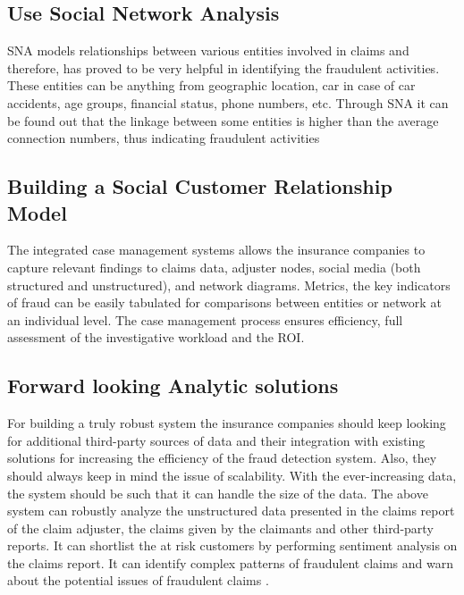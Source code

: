 \documentclass[sigconf]{acmart}
\begin{document}
\subsection{Use Social Network Analysis}
SNA models relationships between various entities involved in claims and therefore, has proved to be very helpful in identifying the fraudulent activities. These entities can be anything from geographic location, car in case of car accidents, age groups, financial status, phone numbers, etc. Through SNA it can be found out that the linkage between some entities is higher than the average connection numbers, thus indicating fraudulent activities
\subsection{Building a Social Customer Relationship Model}
The integrated case management systems allows the insurance companies to capture relevant findings to claims data, adjuster nodes, social media (both structured and unstructured), and network diagrams. Metrics, the key indicators of fraud can be easily tabulated for comparisons between entities or network at an individual level. The case management process ensures efficiency, full assessment of the investigative workload and the ROI.
\subsection{Forward looking Analytic solutions}
For building a truly robust system the insurance companies should keep looking for additional third-party sources of data and their integration with existing solutions for increasing the efficiency of the fraud detection system. Also, they should always keep in mind the issue of scalability. With the ever-increasing data, the system should be such that it can handle the size of the data.
The above system can robustly analyze the unstructured data presented in the claims report of the claim adjuster, the claims given by the claimants and other third-party reports. It can shortlist the at risk customers by performing sentiment analysis on the claims report. It can identify complex patterns of fraudulent claims and warn about the potential issues of fraudulent claims \cite{link7}.
\end{document}
